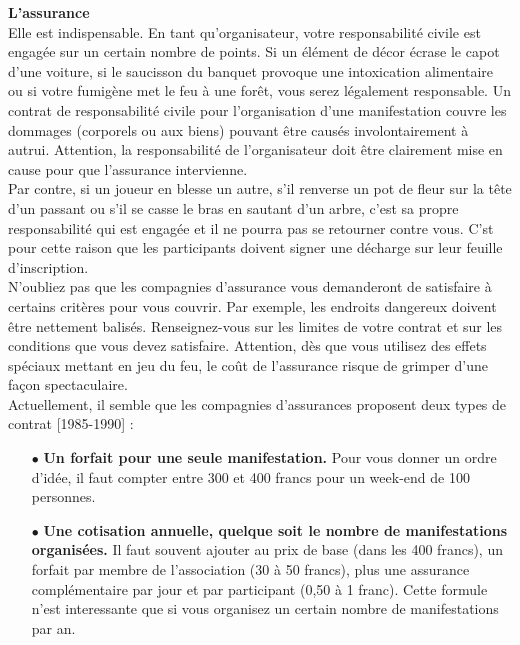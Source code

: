 \documentclass[11pt,twoside,a4paper]{article}
\begin{document}
\begin{multicols*}{2}
\vfill
\clearpage

\textbf{\large L'assurance}~\\

Elle est indispensable. En tant qu'organisateur, votre responsabilit{\'e} civile est engag{\'e}e sur un certain nombre de points. Si un {\'e}l{\'e}ment de d{\'e}cor {\'e}crase le capot d'une voiture, si le saucisson du banquet provoque une intoxication alimentaire ou si votre fumig{\`e}ne met le feu {\`a} une for{\^e}t, vous serez l{\'e}galement responsable. Un contrat de responsabilit{\'e} civile pour l'organisation d'une manifestation couvre les dommages (corporels ou aux biens) pouvant {\^e}tre caus{\'e}s involontairement {\`a} autrui. Attention, la responsabilit{\'e} de l'organisateur doit {\^e}tre clairement mise en cause pour que l'assurance intervienne. ~\\

Par contre, si un joueur en blesse un autre, s'il renverse un pot de fleur sur la t{\^e}te d'un passant ou s'il se casse le bras en sautant d'un arbre, c'est sa propre responsabilit{\'e} qui est engag{\'e}e et il ne pourra pas se retourner contre vous. C'st pour cette raison que les participants doivent signer une d{\'e}charge sur leur feuille d'inscription. ~\\

N'oubliez pas que les compagnies d'assurance vous demanderont de satisfaire {\`a} certains crit{\`e}res pour vous couvrir. Par exemple, les endroits dangereux doivent {\^e}tre nettement balis{\'e}s. Renseignez-vous sur les limites de votre contrat et sur les conditions que vous devez satisfaire. Attention, d{\`e}s que vous utilisez des effets sp{\'e}ciaux mettant en jeu du feu, le co{\^u}t de l'assurance risque de grimper d'une fa\c{c}on spectaculaire. ~\\

Actuellement, il semble que les compagnies d'assurances proposent deux types de contrat [1985-1990] : 
\begin{itemize}
	\item[$\bullet$] \textbf{Un forfait pour une seule manifestation. }Pour vous donner un ordre d'id{\'e}e, il faut compter entre 300 et 400 francs pour un week-end de 100 personnes. 
	\item[$\bullet$] \textbf{Une cotisation annuelle, quelque soit le nombre de manifestations organis{\'e}es. }Il faut souvent ajouter au prix de base (dans les 400 francs), un forfait par membre de l'association (30 {\`a} 50 francs), plus une assurance compl{\'e}mentaire par jour et par participant (0,50 {\`a} 1 franc). Cette formule n'est interessante que si vous organisez un certain nombre de manifestations par an. 
\end{itemize}


\end{multicols*}
\end{document}
